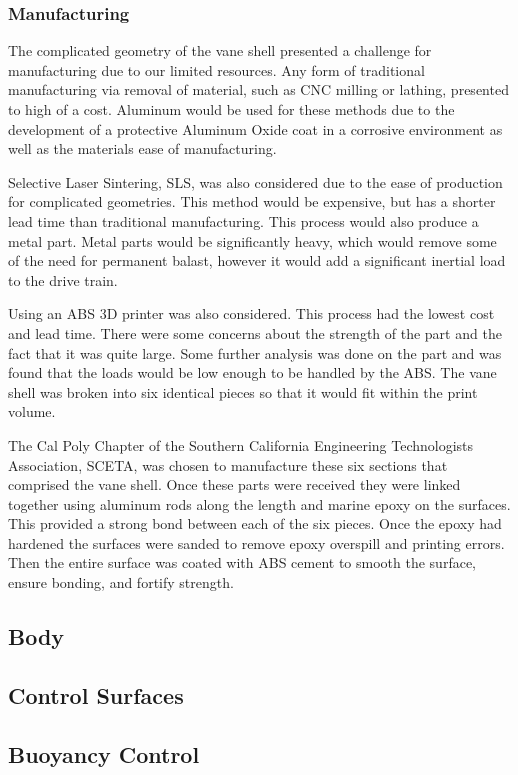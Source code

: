 \documentclass{report}
\begin{document}
\subsubsection{Manufacturing}
The complicated geometry of the vane shell presented a challenge for manufacturing due to our limited resources. Any form of traditional manufacturing via removal of material, such as CNC milling or lathing, presented to high of a cost. Aluminum would be used for these methods due to the development of a protective Aluminum Oxide coat in a corrosive environment as well as the materials ease of manufacturing. \par
Selective Laser Sintering, SLS, was also considered due to the ease of production for complicated geometries. This method would be expensive, but has a shorter lead time than traditional manufacturing. This process would also produce a metal part. Metal parts would be significantly heavy, which would remove some of the need for permanent balast, however it would add a significant inertial load to the drive train.\par
Using an ABS 3D printer was also considered. This process had the lowest cost and lead time. There were some concerns about the strength of the part and the fact that it was quite large. Some further analysis was done on the part and was found that the loads would be low enough to be handled by the ABS. The vane shell was broken into six identical pieces so that it would fit within the print volume. \par
The Cal Poly Chapter of the Southern California Engineering Technologists Association, SCETA, was chosen to manufacture these six sections that comprised the vane shell.  Once these parts were received they were linked together using aluminum rods along the length and marine epoxy on the surfaces. This provided a strong bond between each of the six pieces. Once the epoxy had hardened the surfaces were sanded to remove epoxy overspill and printing errors. Then the entire surface was coated with ABS cement to smooth the surface, ensure bonding, and fortify strength.
\subsection{Body}
\subsection{Control Surfaces}
\subsection{Buoyancy Control}
\end{document}
